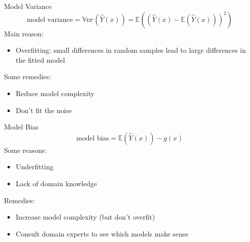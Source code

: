 \documentclass[aspectratio=169]{../latex_main/tntbeamer}  %
\begin{document}
	\begin{frame}[c]{Model Variance}
	    \begin{equation*}
	        \text{model variance} = \mathbb{Var}(\hat{Y}(x)) = \mathbb{E}((\hat{Y}(x) - \mathbb{E}(\hat{Y}(x)))^2)
	    \end{equation*}
	    Main reason:
	    \begin{itemize}
	        \item Overfitting: small differences in random samples lead to large differences in the fitted model
	    \end{itemize}
	    \bigskip
	    Some remedies:
	    \begin{itemize}
	        \item Reduce model complexity
	        \item Don’t fit the noise
	    \end{itemize}
	\end{frame}
	
	
	\begin{frame}[c]{Model Bias}
	    \begin{equation*}
	        \text{model bias} = \mathbb{E}(\hat{Y}(x)) - g(x)
	    \end{equation*}
	    Some reasons:
	    \begin{itemize}
	        \item Underfitting
	        \item Lack of domain knowledge
	    \end{itemize}
	    \bigskip
	    Remedies:
	    \begin{itemize}
	        \item Increase model complexity (but don’t overfit)
	        \item Consult domain experts to see which models make sense
	    \end{itemize}
	\end{frame}
	
\end{document}
